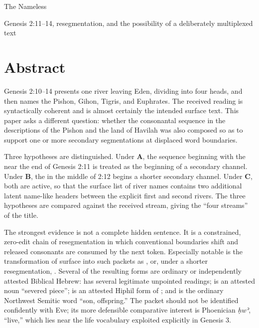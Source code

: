 



\pagestyle{plain}
\def\CurrentBook{We Academy}%
\def\CurrentTitleBook{We Academy}%
\def\CurrentApocryphaHeader{We Academy}%
\def\CurrentChapter{The Four Streams}%
%



\begin{center}
{\large The Nameless\par}
\vspace{0.35em}
{\small Genesis 2:11--14, resegmentation, and the possibility of a deliberately multiplexed text\par}
\end{center}

\section*{Abstract}

Genesis 2:10--14 presents one river leaving Eden, dividing into four heads, and then names the Pishon, Gihon, Tigris, and Euphrates.  The received reading is syntactically coherent and is almost certainly the intended surface text.  This paper asks a different question: whether the consonantal sequence in the descriptions of the Pishon and the land of Havilah was also composed so as to support one or more secondary segmentations at displaced word boundaries.

Three hypotheses are distinguished.  Under \textbf{A}, the sequence beginning with the  near the end of Genesis 2:11 is treated as the beginning of a secondary channel.  Under \textbf{B}, the  in the middle of 2:12 begins a shorter secondary channel.  Under \textbf{C}, both are active, so that the surface list of river names contains two additional latent name-like headers between the explicit first and second rivers.  The three hypotheses are compared against the received stream, giving the ``four streams'' of the title.

The strongest evidence is not a complete hidden sentence.  It is a constrained, zero-edit chain of resegmentation in which conventional boundaries shift and released consonants are consumed by the next token.  Especially notable is the transformation of surface  into such packets as , or, under a shorter resegmentation, .  Several of the resulting forms are ordinary or independently attested Biblical Hebrew:  has several legitimate unpointed readings;  is an attested noun ``severed piece'';  is an attested Hiphil form of ; and  is the ordinary Northwest Semitic word ``son, offspring.''  The packet  should not be identified confidently with Eve; its more defensible comparative interest is Phoenician \textit{ḥwʾ}, ``live,'' which lies near the life vocabulary exploited explicitly in Genesis 3.

